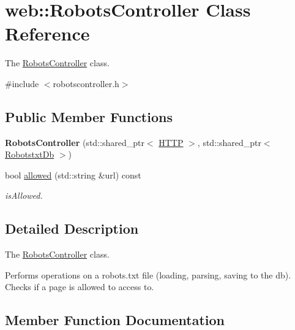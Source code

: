 \hypertarget{classweb_1_1RobotsController}{}\section{web\+:\+:Robots\+Controller Class Reference}
\label{classweb_1_1RobotsController}


The \hyperlink{classweb_1_1RobotsController}{Robots\+Controller} class.  




{\ttfamily \#include $<$robotscontroller.\+h$>$}

\subsection*{Public Member Functions}
\begin{DoxyCompactItemize}
\item 
{\bfseries Robots\+Controller} (std\+::shared\+\_\+ptr$<$ \hyperlink{classweb_1_1HTTP}{H\+T\+TP} $>$, std\+::shared\+\_\+ptr$<$ \hyperlink{classRobotstxtDb}{Robotstxt\+Db} $>$)\hypertarget{classweb_1_1RobotsController_ad9daef54253c82dad14e29c717646e5e}{}\label{classweb_1_1RobotsController_ad9daef54253c82dad14e29c717646e5e}

\item 
bool \hyperlink{classweb_1_1RobotsController_a087740854f14a7de97707b3c4db63800}{allowed} (std\+::string \&url) const 
\begin{DoxyCompactList}\small\item\em is\+Allowed. \end{DoxyCompactList}\end{DoxyCompactItemize}


\subsection{Detailed Description}
The \hyperlink{classweb_1_1RobotsController}{Robots\+Controller} class. 

Performs operations on a robots.\+txt file (loading, parsing, saving to the db). Checks if a page is allowed to access to. 

\subsection{Member Function Documentation}

